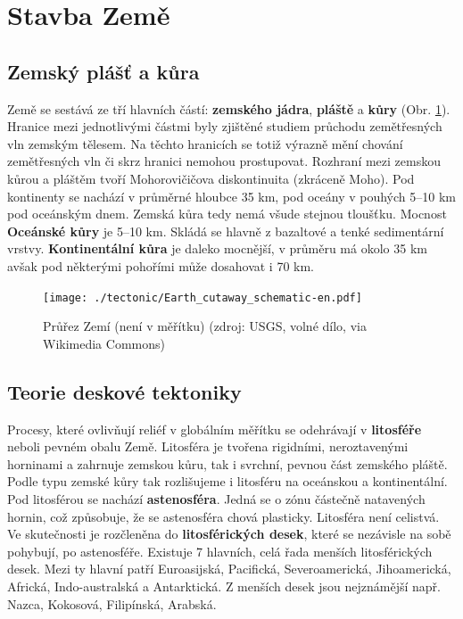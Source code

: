 \section{Stavba Země}

\subsection{Zemský plášť a kůra}
Země se sestává ze tří hlavních částí: \textbf{zemského jádra}, \textbf{pláště} a \textbf{kůry} (Obr. \ref{fig:stavba_zeme}). Hranice mezi jednotlivými částmi byly zjištěné studiem průchodu zemětřesných vln zemským tělesem. Na těchto hranicích se totiž výrazně mění chování zemětřesných vln či skrz hranici nemohou prostupovat. Rozhraní mezi zemskou kůrou a pláštěm tvoří Mohorovičičova diskontinuita (zkráceně Moho). Pod kontinenty se nachází v průměrné hloubce 35 km, pod oceány v pouhých 5--10 km pod oceánským dnem. Zemská kůra tedy nemá všude stejnou tloušťku. Mocnost \textbf{Oceánské kůry} je 5--10 km. Skládá se hlavně z bazaltové a tenké sedimentární vrstvy. \textbf{Kontinentální kůra} je daleko mocnější, v průměru má okolo 35 km avšak pod některými pohořími může dosahovat i 70 km. 

%

\begin{figure}[h]
	\texttt{[image: ./tectonic/Earth\_cutaway\_schematic-en.pdf]}
	\caption{Průřez Zemí (není v měřítku) (zdroj: USGS, volné dílo, via Wikimedia Commons)}
	\label{fig:stavba_zeme}
\end{figure}

\subsection{Teorie deskové tektoniky}
Procesy, které ovlivňují reliéf v globálním měřítku se odehrávají v \textbf{litosféře} neboli pevném obalu Země. Litosféra je tvořena rigidními, neroztavenými horninami a zahrnuje zemskou kůru, tak i svrchní, pevnou část zemského pláště. Podle typu zemské kůry tak rozlišujeme i litosféru na oceánskou a kontinentální. 
Pod litosférou se nachází \textbf{astenosféra}. Jedná se o zónu částečně natavených hornin, což způsobuje, že se astenosféra chová plasticky. 
Litosféra není celistvá. Ve skutečnosti je rozčleněna do \textbf{litosférických desek}, které se nezávisle na sobě pohybují, po astenosféře. Existuje 7 hlavních, celá řada menších litosférických desek. Mezi ty hlavní patří Euroasijská, Pacifická, Severoamerická, Jihoamerická, Africká, Indo-australská a Antarktická. Z menších desek jsou nejznámější např. Nazca, Kokosová, Filipínská, Arabská. 

